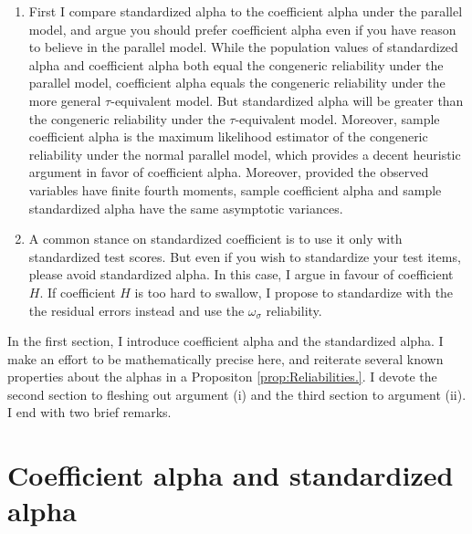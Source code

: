 \documentclass{article}
\theoremstyle{plain}
\theoremstyle{plain}
\theoremstyle{definition}
\theoremstyle{remark}
\theoremstyle{definition}
\theoremstyle{plain}
\theoremstyle{plain}
\theoremstyle{definition}
\begin{document}
\begin{enumerate}[label=\arabic*.]
\item First I compare standardized alpha to the coefficient alpha under the parallel model, and argue you should prefer coefficient alpha even if you have reason to believe in the parallel model. While the population values of standardized alpha and coefficient alpha both equal the congeneric reliability under the parallel model, coefficient alpha equals the congeneric reliability under the more general $\tau$-equivalent model. But standardized alpha will be greater than the congeneric reliability under the $\tau$-equivalent model. Moreover, sample coefficient alpha is the maximum likelihood estimator of the congeneric reliability under the normal parallel model, which provides a decent heuristic argument in favor of coefficient alpha. Moreover, provided the observed variables have finite fourth moments, sample coefficient alpha and sample standardized alpha have the same asymptotic variances. 

\item A common stance on standardized coefficient is to use it only with standardized test scores. But even if you wish to standardize your test items, please avoid standardized alpha.  In this case, I argue in favour of coefficient $H$. If coefficient $H$ is too hard to swallow, I propose to standardize with the the residual errors instead and use the $\omega_\sigma$ reliability.
\end{enumerate}

In the first section, I introduce coefficient alpha and the standardized alpha. I make an effort to be mathematically precise here, and reiterate several known properties about the alphas in a Propositon \ref{prop:Reliabilities.}. I devote the second section to fleshing out argument (i) and the third section to argument (ii). I end with two brief remarks.
\section{Coefficient alpha and standardized alpha}
\end{document}
